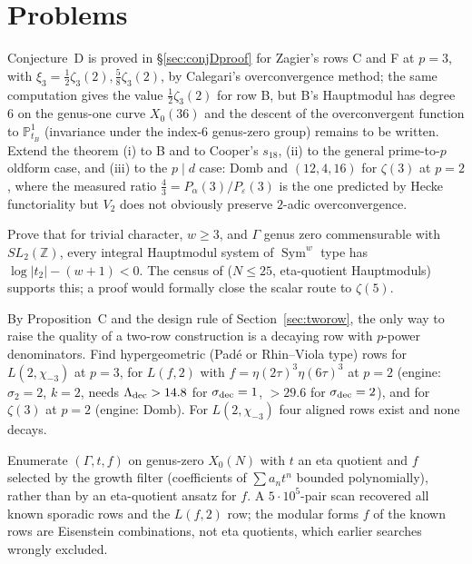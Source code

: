 \section{Problems}\label{sec:problems}

\begin{problem}[Rigidity]\label{prob:rigidity}
Conjecture~D is proved in \S\ref{sec:conjDproof} for Zagier's rows C and F at $p=3$, with $\xi_3=\tfrac12\zeta_3(2),\tfrac58\zeta_3(2)$, by Calegari's overconvergence method; the same computation gives the value $\tfrac12\zeta_3(2)$ for row B, but B's Hauptmodul has degree $6$ on the genus-one curve $X_0(36)$ and the descent of the overconvergent function to $\mathbb P^1_{t_B}$ (invariance under the index-$6$ genus-zero group) remains to be written. Extend the theorem (i) to B and to Cooper's $s_{18}$, (ii) to the general prime-to-$p$ oldform case, and (iii) to the $p\mid d$ case: Domb and $(12,4,16)$ for $\zeta(3)$ at $p=2$, where the measured ratio $\tfrac43=P_\alpha(3)/P_\varepsilon(3)$ is the one predicted by Hecke functoriality but $V_2$ does not obviously preserve $2$-adic overconvergence.
\end{problem}

\begin{problem}\label{prob:barrier}
Prove that for trivial character, $w\ge3$, and $\Gamma$ genus zero commensurable with $SL_2(\mathbb Z)$, every integral Hauptmodul system of $\operatorname{Sym}^w$ type has $\log|t_2|-(w+1)<0$. The census of \cite{ProjectRace} ($N\le25$, eta-quotient Hauptmoduls) supports this; a proof would formally close the scalar route to $\zeta(5)$.
\end{problem}

\begin{problem}\label{prob:partners}
By Proposition~C and the design rule of Section~\ref{sec:tworow}, the only way to raise the quality of a two-row construction is a decaying row with $p$-power denominators. Find hypergeometric (Padé or Rhin--Viola type) rows for $L(2,\chi_{-3})$ at $p=3$, for $L(f,2)$ with $f=\eta(2\tau)^3\eta(6\tau)^3$ at $p=2$ (engine: $\sigma_2=2$, $k=2$, needs $\Lambda_{\rm dec}>14.8$ for $\sigma_{\rm dec}=1$, $>29.6$ for $\sigma_{\rm dec}=2$), and for $\zeta(3)$ at $p=2$ (engine: Domb). For $L(2,\chi_{-3})$ four aligned rows exist and none decays.
\end{problem}

\begin{problem}\label{prob:sporadic}
Enumerate $(\Gamma,t,f)$ on genus-zero $X_0(N)$ with $t$ an eta quotient and $f$ selected by the growth filter (coefficients of $\sum a_nt^n$ bounded polynomially), rather than by an eta-quotient ansatz for $f$. A $5\cdot10^5$-pair scan recovered all known sporadic rows and the $L(f,2)$ row; the modular forms $f$ of the known rows are Eisenstein combinations, not eta quotients, which earlier searches wrongly excluded.
\end{problem}


